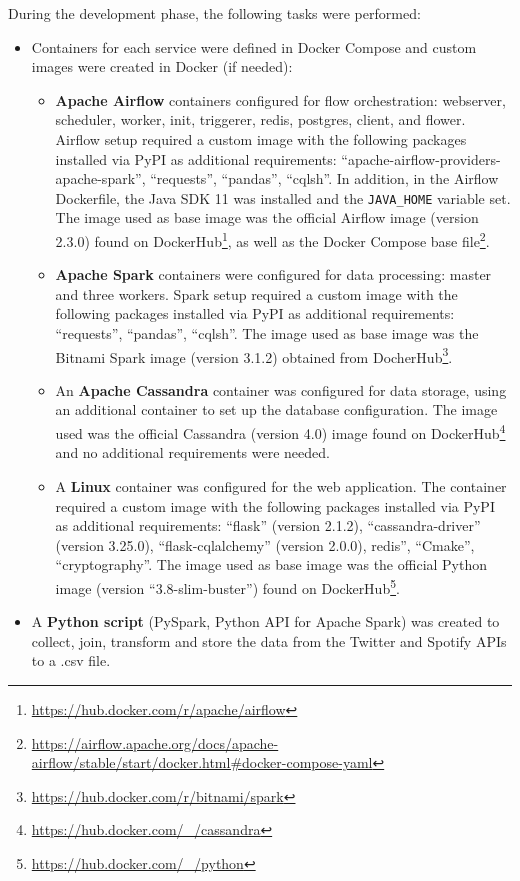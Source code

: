 \nonzeroparskip During the development phase, the following tasks were performed:
\begin{itemize}
	\item Containers for each service were defined in Docker Compose and custom images were created in Docker (if needed):
	\begin{itemize}
		\item \textbf{Apache Airflow} containers configured for flow orchestration: webserver, scheduler, worker, init, triggerer, redis, postgres, client, and flower. Airflow setup required a custom image with the following packages installed via PyPI as additional requirements: ``apache-airflow-providers-apache-spark'', ``requests'', ``pandas'', ``cqlsh''. In addition, in the Airflow Dockerfile, the Java SDK 11 was installed and the \texttt{JAVA\_HOME} variable set. The image used as base image was the official Airflow image (version 2.3.0) found on DockerHub\footnote{\url{https://hub.docker.com/r/apache/airflow}}, as well as the Docker Compose base file\footnote{\url{https://airflow.apache.org/docs/apache-airflow/stable/start/docker.html\#docker-compose-yaml}}.
		\item \textbf{Apache Spark} containers were configured for data processing: master and three workers. Spark setup required a custom image with the following packages installed via PyPI as additional requirements: ``requests'', ``pandas'', ``cqlsh''. The image used as base image was the Bitnami Spark image (version 3.1.2) obtained from DocherHub\footnote{\url{https://hub.docker.com/r/bitnami/spark}}.
		\item An \textbf{Apache Cassandra} container was configured for data storage, using an additional container to set up the database configuration. The image used was the official Cassandra (version 4.0) image found on DockerHub\footnote{\url{https://hub.docker.com/_/cassandra}} and no additional requirements were needed.
		\item A \textbf{Linux} container was configured for the web application. The container required a custom image with the following packages installed via PyPI as additional requirements: ``flask'' (version 2.1.2), ``cassandra-driver'' (version 3.25.0), ``flask-cqlalchemy'' (version 2.0.0), redis'', ``Cmake'', ``cryptography''. The image used as base image was the official Python image (version ``3.8-slim-buster'') found on DockerHub\footnote{\url{https://hub.docker.com/_/python}}.
	\end{itemize}
	\item A \textbf{Python script} (PySpark, Python API for Apache Spark) was created to collect, join, transform and store the data from the Twitter and Spotify APIs to a .csv file.

\end{itemize}
